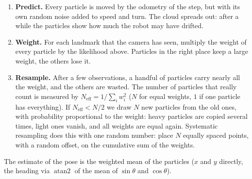 \begin{center}
\end{center}

\begin{enumerate}[nosep]
  \item \textbf{Predict.} Every particle is moved by the odometry of the step, but with its own random noise added to speed and turn. The cloud spreads out: after a while the particles show how much the robot may have drifted.
  \item \textbf{Weight.} For each landmark that the camera has seen, multiply the weight of every particle by the likelihood above. Particles in the right place keep a large weight, the others lose it.
  \item \textbf{Resample.} After a few observations, a handful of particles carry nearly all the weight, and the others are wasted. The number of particles that really count is measured by $N_{\text{eff}}=1/\sum_i w_i^2$ ($N$ for equal weights, $1$ if one particle has everything). If $N_{\text{eff}}<N/2$ we draw $N$ new particles from the old ones, with probability proportional to the weight: heavy particles are copied several times, light ones vanish, and all weights are equal again. Systematic resampling does this with one random number: place $N$ equally spaced points, with a random offset, on the cumulative sum of the weights.
\end{enumerate}
The estimate of the pose is the weighted mean of the particles ($x$ and $y$ directly, the heading via $\operatorname{atan2}$ of the mean of $\sin\theta$ and $\cos\theta$).

